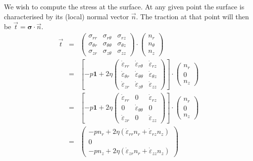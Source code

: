 We wish to compute the stress at the surface. At any given point the surface is characterised
by its (local) normal vector $\vec{n}$. The traction at that point will then be $\vec{t}={\bm \sigma}\cdot \vec{n}$.
\begin{eqnarray}
\vec{t} &=& 
\left(
\begin{array}{ccc}
\sigma_{rr} & \sigma_{r \theta} & \sigma_{rz} \\
\sigma_{\theta r} & \sigma_{\theta\theta} & \sigma_{\theta z} \\
\sigma_{z r} & \sigma_{z \theta} & \sigma_{zz} 
\end{array}
\right)
\cdot 
\left(
\begin{array}{c}
n_r \\ n_\theta \\ n_z
\end{array}
\right)  \\
&=&
\left[
- p {\bm 1} + 2 \eta 
\left(
\begin{array}{ccc}
\dot{\varepsilon}_{rr}       & \dot{\varepsilon}_{r \theta}     & \dot{\varepsilon}_{rz} \\
\dot{\varepsilon}_{\theta r} & \dot{\varepsilon}_{\theta\theta} & \dot{\varepsilon}_{\theta z} \\
\dot{\varepsilon}_{z r}      & \dot{\varepsilon}_{z \theta}     & \dot{\varepsilon}_{zz} 
\end{array}
\right)
\right]
\cdot 
\left(
\begin{array}{c}
n_r \\ 0 \\ n_z
\end{array}
\right) \\
&=&
\left[
- p {\bm 1} + 2 \eta 
\left(
\begin{array}{ccc}
\dot{\varepsilon}_{rr}       & 0     & \dot{\varepsilon}_{rz} \\
0  & \dot{\varepsilon}_{\theta\theta} & 0 \\
\dot{\varepsilon}_{z r}      & 0     & \dot{\varepsilon}_{zz} 
\end{array}
\right)
\right]
\cdot 
\left(
\begin{array}{c}
n_r \\ 0 \\ n_z
\end{array}
\right) \\
&=& 
\left(
\begin{array}{c}
-p n_r  + 2 \eta ( \dot{\varepsilon}_{rr} n_r + \dot{\varepsilon}_{rz} n_z) \\
0 \\
-p n_z + 2 \eta (\dot{\varepsilon}_{z r} n_r +  \dot{\varepsilon}_{zz}  n_z )
\end{array}
\right) 
\end{eqnarray}

